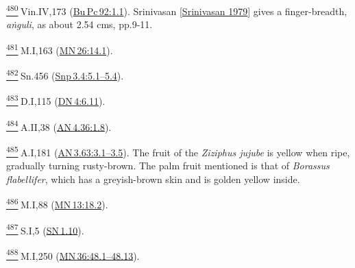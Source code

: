 \label{footprints_split_025.html_fn480}
\hyperref[footprints_split_013.htmlux5cux23fnref480]{\textsuperscript{480}} Vin.IV,173
(\href{https://suttacentral.net/pli-tv-bu-vb-pc92/en/brahmali\#1.1}{Bu\,Pc\,92:1.1}).
{Srinivasan
{{[}\hyperref[footprints_split_022.htmlux5cux23Srinivasanux5cux25201979]{Srinivasan
1979}{]}}} gives a finger-breadth, \emph{aṅguli}, as about 2.54 cms,
pp.9-11.

\label{footprints_split_025.html_fn481}
\hyperref[footprints_split_013.htmlux5cux23fnref481]{\textsuperscript{481}} M.I,163
(\href{https://suttacentral.net/mn26/en/sujato\#14.1}{MN\,26:14.1}).

\label{footprints_split_025.html_fn482}
\hyperref[footprints_split_013.htmlux5cux23fnref482]{\textsuperscript{482}} Sn.456
(\href{https://suttacentral.net/snp3.4/en/sujato\#5.1}{Snp\,3.4:5.1--5.4}).

\label{footprints_split_025.html_fn483}
\hyperref[footprints_split_013.htmlux5cux23fnref483]{\textsuperscript{483}} D.I,115
(\href{https://suttacentral.net/dn4/en/sujato\#6.11}{DN\,4:6.11}).

\label{footprints_split_025.html_fn484}
\hyperref[footprints_split_013.htmlux5cux23fnref484]{\textsuperscript{484}} A.II,38
(\href{https://suttacentral.net/an4.36/en/sujato\#1.8}{AN\,4.36:1.8}).

\label{footprints_split_025.html_fn485}
\hyperref[footprints_split_013.htmlux5cux23fnref485]{\textsuperscript{485}} A.I,181
(\href{https://suttacentral.net/an3.63/en/sujato\#3.1}{AN\,3.63:3.1--3.5}).
The fruit of the \emph{Ziziphus jujube} is yellow when ripe, gradually
turning rusty-brown. The palm fruit mentioned is that of \emph{Borassus
flabellifer}, which has a greyish-brown skin and is golden yellow
inside.

\label{footprints_split_025.html_fn486}
\hyperref[footprints_split_013.htmlux5cux23fnref486]{\textsuperscript{486}} M.I,88
(\href{https://suttacentral.net/mn13/en/sujato\#18.2}{MN\,13:18.2}).

\label{footprints_split_025.html_fn487}
\hyperref[footprints_split_013.htmlux5cux23fnref487]{\textsuperscript{487}} S.I,5
(\href{https://suttacentral.net/sn1.10/en/sujato}{SN\,1.10}).

\label{footprints_split_025.html_fn488}
\hyperref[footprints_split_013.htmlux5cux23fnref488]{\textsuperscript{488}} M.I,250
(\href{https://suttacentral.net/mn36/en/sujato\#48.1}{MN\,36:48.1--48.13}).

